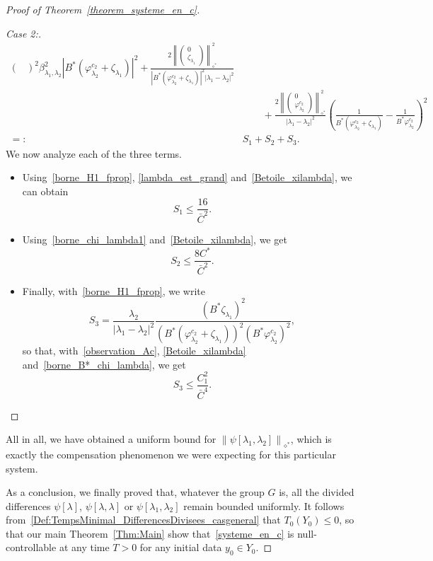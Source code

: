\documentclass[AHL,Unicode,longabstracts]{cedram}
\newenvironment{step}[1]{\begin{proof}[#1]}{\let\qed\relax\end{proof}}
\newcommand{\fprop}[2]{\varphi^{#1}_{#2}}
\newcommand{\Fzp}{Y_0}
\newcommand{\normeXalphas}[1]{\left\| #1 \right\|_{\diamond^*}}
\begin{document}
\begin{proof}[Proof of Theorem~\ref{theorem_systeme_en_c}]
\begin{step}{Case 2:}
\begin{align*}
{{\begin{pmatrix}
\end{pmatrix}}^2}{\beta_{\lambda_1,\lambda_2}^2|B^*(\fprop{c_2}{\lambda_2} + \zeta_{\lambda_1})|^2}
+ \frac{2\normeXalphas{
\begin{pmatrix} 0 \\ \zeta_{\lambda_1}
\end{pmatrix}}^2 }{|B^*\left(\fprop{c_2}{\lambda_2} + \zeta_{\lambda_1}\right)|^2 |\lambda_1-\lambda_2|^2}\\
&
\quad\quad + \frac{2\normeXalphas{
\begin{pmatrix} 0 \\ \fprop{c_2}{\lambda_2}
\end{pmatrix}}^2}{|\lambda_1-\lambda_2|^2} \left(\frac{1}{B^*\left(\fprop{c_2}{\lambda_2}+\zeta_{\lambda_1}\right)} - \frac{1}{B^*\fprop{c_2}{\lambda_2}}\right)^2\\
=: & S_1 + S_2 + S_3.
\end{align*}
We now analyze each of the three terms.
\begin{itemize}
\item Using~\eqref{borne_H1_fprop}, \eqref{lambda_est_grand} and~\eqref{Betoile_xilambda}, we can obtain
\[
S_1\leq \frac{16}{\bar{C}^2}.
\]
\item Using~\eqref{borne_chi_lambda1} and~\eqref{Betoile_xilambda}, we get
\[
S_2 \leq \frac{8 C^*}{\bar{C}^2}.
\]
\item Finally, with~\eqref{borne_H1_fprop}, we write
\[
S_3 = \frac{\lambda_2}{|\lambda_1-\lambda_2|^2}\frac{(B^* \zeta_{\lambda_1})^2}{\left(B^*\left(\fprop{c_2}{\lambda_2}+\zeta_{\lambda_1}\right)\right)^2 \left(B^*\fprop{c_2}{\lambda_2}\right)^2},
\]
so that, with~\eqref{observation_Ac}, \eqref{Betoile_xilambda} and~\eqref{borne_B*_chi_lambda}, we get
\[
S_3\leq \frac{C_1^2}{\bar{C}^4}.
\]
\end{itemize}
\end{step}
All in all, we have obtained a uniform bound for $\normeXalphas{\psi[\lambda_1,\lambda_2]}$, which is exactly the compensation phenomenon we were expecting for this particular system.



As a conclusion, we finally proved that, whatever the group $G$ is, all the divided differences $\psi[\lambda]$, $\psi[\lambda,\lambda]$ or $\psi[\lambda_1,\lambda_2]$ remain bounded uniformly. It follows from~\eqref{Def:TempsMinimal_DifferencesDivisees_casgeneral} that $T_0(\Fzp)\leq 0$, so that our main Theorem~\ref{Thm:Main} show that~\eqref{systeme_en_c} is null-controllable at any time $T>0$ for any initial data $y_0\in \Fzp$.
\end{proof}
\end{document}

